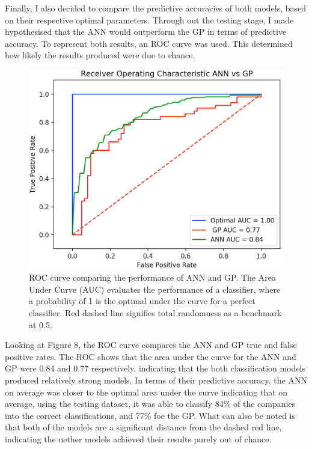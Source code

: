 \documentclass[11pt]{article}
\begin{document}
Finally, I also decided to compare the predictive accuracies of both models, based on their respective optimal parameters. Through out the testing stage, I made hypothesised that the ANN would outperform the GP in terms of predictive accuracy. To represent both results, an ROC curve was used. This  determined how likely the results produced were due to chance. 
\begin{figure}[h]
\centering
\includegraphics[scale = .50]{rocanngp}
\caption{ROC curve comparing the performance of ANN and GP. The Area Under Curve (AUC)  evaluates the performance of a classifier, where a probability of 1 is the optimal under the curve for a perfect classifier. Red dashed line signifies total randomness as a benchmark at 0.5.  } 
\end{figure}
Looking at Figure 8, the ROC curve compares the ANN and GP true and false positive rates. The ROC shows that the area under the curve for the ANN and GP were 0.84 and 0.77 respectively, indicating that the both classification models produced relatively strong models. In terms of their predictive accuracy, the ANN on average was closer to the optimal area under the curve indicating that on average, using the testing dataset, it was able to classify 84\% of the companies into the correct classifications, and 77\% foe the GP. What can also be noted is that both of the models are a significant distance from the dashed red line, indicating the nether models achieved their results purely out of chance. \\
\end{document}
